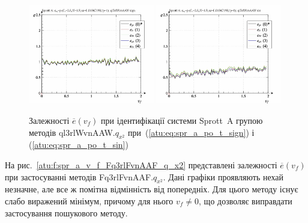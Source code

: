 \begin{figure}[htb!]
  \centerline{
    \includegraphics[width=0.49\textwidth]{p/cha/spr_a/ql3rlWvnAAW_x2/sprott_a_id-p_v_f_sign.png}
    \hfill
    \includegraphics[width=0.49\textwidth]{p/cha/spr_a/ql3rlWvnAAW_x2/sprott_a_id-p_v_f_sin.png}
  }
\caption{Залежності $ \overline{e} (v_f) $ при ідентифікації системи Sprott~A групою методів ql3rlWvnAAW.$q_{x^2} $ при~(\ref{atu:eq:spr_a_po_t_sign}) і (\ref{atu:eq:spr_a_po_t_sin})}
  \label{atu:f:spr_a_v_f_ql3rlWvnAAW_q_x2}
\end{figure}

На рис.~\ref{atu:f:spr_a_v_f_Fq3rlFvnAAF_q_x2} представлені залежності
$ \overline{e} (v_f) $ при застосуванні методів Fq3rlFvnAAF.$q_{x^2} $. Дані графіки проявляють нехай незначне, але все ж
помітна відмінність від попередніх. Для цього методу існує
слабо виражений мінімум, причому для нього
$ v_f \ne 0 $, що дозволяє виправдати застосування пошукового методу.

